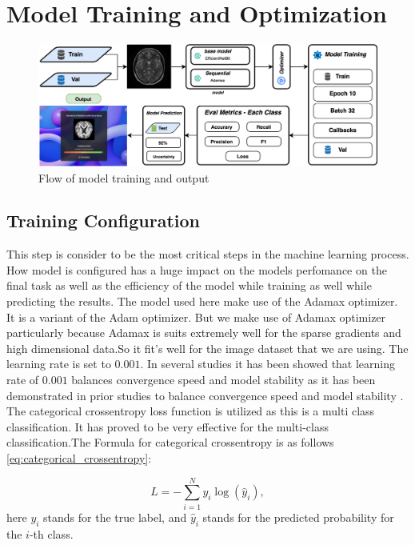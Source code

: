 \documentclass[12pt,onecolumn]{report}
\begin{document}
\section{Model Training and Optimization}
\begin{figure}[h!]
    \centering
    \includegraphics[width=1.0\columnwidth]{figures/model_training_optimization.png}  %
    \caption{Flow of model training and output} %
    \label{fig:model training} %
\end{figure}



\subsection{Training Configuration}
This step is consider to be the most critical steps in the machine learning process. How model is configured has a huge impact on the models perfomance on the final task as well as the efficiency of the model while training as well while predicting the results. The model used here make use of the Adamax optimizer. It is a variant of the Adam optimizer. But we make use of Adamax optimizer particularly because Adamax is suits extremely well for the sparse gradients and high dimensional data.So it fit's well for the image dataset that we are using. The learning rate is set to \(0.001\). In several studies it has been showed that learning rate of \(0.001\) balances convergence speed and model stability as it has been demonstrated in prior studies to balance convergence speed and model stability \cite{2017Kingma}. The categorical crossentropy loss function is utilized as this is a multi class classification. It has proved to be very effective for the multi-class classification.The Formula for categorical crossentropy is as follows \ref{eq:categorical_crossentropy}:

\begin{equation}
    L = -\sum_{i=1}^{N} y_i \log(\hat{y}_i),
    \label{eq:categorical_crossentropy}
\end{equation}
here \(y_i\) stands for the true label, and \(\hat{y}_i\) stands for the predicted probability for the \(i\)-th class.
\end{document}
